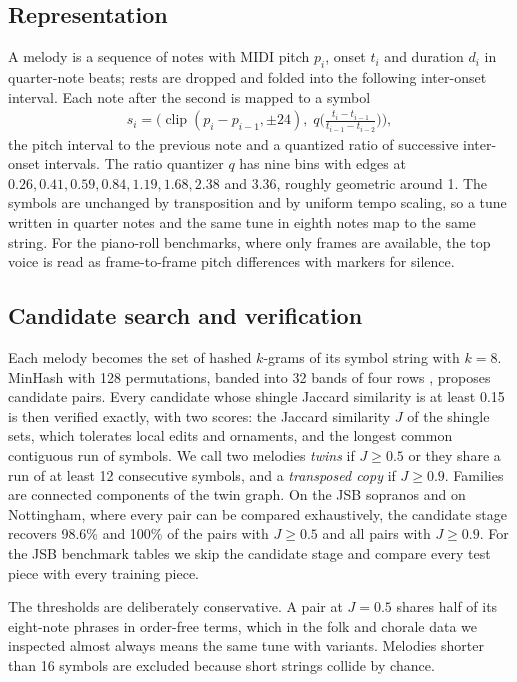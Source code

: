 \documentclass[ProofPDF]{./Styles/Jnls-Template-V3}
\begin{document}
\subsection{Representation}
A melody is a sequence of notes with MIDI pitch $p_i$, onset $t_i$ and duration $d_i$ in quarter-note beats; rests are dropped and folded into the following inter-onset interval. Each note after the second is mapped to a symbol
\begin{align}\label{eq:symbol}
s_i = \Big(\operatorname{clip}(p_i - p_{i-1}, \pm 24),\; q\big(\tfrac{t_i - t_{i-1}}{t_{i-1} - t_{i-2}}\big)\Big),
\end{align}
the pitch interval to the previous note and a quantized ratio of successive inter-onset intervals. The ratio quantizer $q$ has nine bins with edges at $0.26, 0.41, 0.59, 0.84, 1.19, 1.68, 2.38$ and $3.36$, roughly geometric around 1. The symbols are unchanged by transposition and by uniform tempo scaling, so a tune written in quarter notes and the same tune in eighth notes map to the same string. For the piano-roll benchmarks, where only frames are available, the top voice is read as frame-to-frame pitch differences with markers for silence.

\subsection{Candidate search and verification}
Each melody becomes the set of hashed $k$-grams of its symbol string with $k=8$. MinHash \citep{broder1997resemblance} with 128 permutations, banded into 32 bands of four rows \citep{indyk1998ann}, proposes candidate pairs. Every candidate whose shingle Jaccard similarity is at least 0.15 is then verified exactly, with two scores: the Jaccard similarity $J$ of the shingle sets, which tolerates local edits and ornaments, and the longest common contiguous run of symbols. We call two melodies \textit{twins} if $J \geq 0.5$ or they share a run of at least 12 consecutive symbols, and a \textit{transposed copy} if $J \geq 0.9$. Families are connected components of the twin graph. On the JSB sopranos and on Nottingham, where every pair can be compared exhaustively, the candidate stage recovers 98.6\% and 100\% of the pairs with $J \geq 0.5$ and all pairs with $J \geq 0.9$. For the JSB benchmark tables we skip the candidate stage and compare every test piece with every training piece.

The thresholds are deliberately conservative. A pair at $J = 0.5$ shares half of its eight-note phrases in order-free terms, which in the folk and chorale data we inspected almost always means the same tune with variants. Melodies shorter than 16 symbols are excluded because short strings collide by chance.
\end{document}
